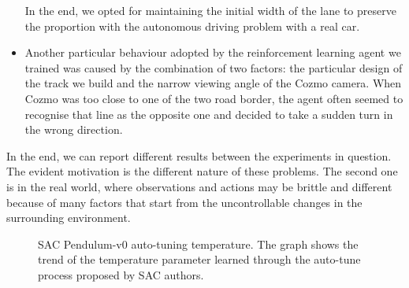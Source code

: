 \begin{itemize}
          In the end, we opted for maintaining the initial width of the lane to preserve the proportion with the autonomous driving problem with a real car.
    \item Another particular behaviour adopted by the reinforcement learning agent we trained was caused by the combination of two factors: the particular design of the track we build and the narrow viewing angle of the Cozmo camera.
          When Cozmo was too close to one of the two road border, the agent often seemed to recognise that line as the opposite one and decided to take a sudden turn in the wrong direction.
\end{itemize}

In the end, we can report different results between the experiments in question.
The evident motivation is the different nature of these problems.
The second one is in the real world, where observations and actions may be brittle and different because of many factors that start from the uncontrollable changes in the surrounding environment.

%
%

\begin{figure}[!h]
    \centering
    \caption[SAC CozmoDriver-v0 auto-tuning temperature]{SAC Pendulum-v0 auto-tuning temperature.
        The graph shows the trend of the temperature parameter learned through the auto-tune process proposed by SAC authors.}
    \label{fig:sac_cozmo_temperature}
\end{figure}


